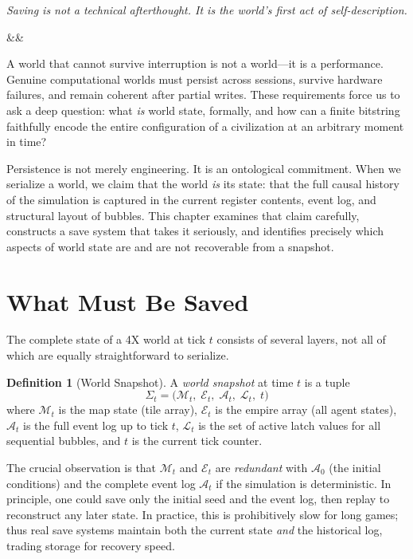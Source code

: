 \documentclass[11pt,a4paper,openany]{book}
\theoremstyle{plain}
\theoremstyle{definition}
\newtheorem{definition}[theorem]{Definition}
\theoremstyle{remark}
\newenvironment{background}{%
  \begin{mdframed}[
    linecolor=sphereblue!40, backgroundcolor=sphereblue!5,
    linewidth=1pt, innertopmargin=8pt, innerbottommargin=8pt,
    innerleftmargin=10pt, innerrightmargin=10pt,
    skipabove=10pt, skipbelow=6pt
  ]%
  \setlength{\parindent}{0pt}%
  \noindent{\textcolor{sphereblue}{\textbf{Background}}}\par\smallskip\ignorespaces
}{\end{mdframed}}
\newcommand{\chapterquote}[2]{%
  \par\vspace{0.8em}%
  \begin{flushright}%
    \begin{minipage}{0.65\textwidth}%
      {\itshape #1\par}%
      \ifx&#2&\else\vspace{0.3em}{\raggedleft\small--- #2\par}\fi%
    \end{minipage}%
  \end{flushright}%
  \vspace{0.8em}\par\noindent}
\begin{document}
\chapterquote{Saving is not a technical afterthought.
  It is the world's first act of self-description.
}{}

\begin{background}
  A world that cannot survive interruption is not a world---it is a
  performance. Genuine computational worlds must persist across sessions,
  survive hardware failures, and remain coherent after partial writes.
  These requirements force us to ask a deep question: what \emph{is}
  world state, formally, and how can a finite bitstring faithfully encode
  the entire configuration of a civilization at an arbitrary moment in time?

  Persistence is not merely engineering. It is an ontological commitment.
  When we serialize a world, we claim that the world \emph{is} its state:
  that the full causal history of the simulation is captured in the current
  register contents, event log, and structural layout of bubbles. This
  chapter examines that claim carefully, constructs a save system that
  takes it seriously, and identifies precisely which aspects of world state
  are and are not recoverable from a snapshot.
\end{background}

\section{What Must Be Saved}

The complete state of a 4X world at tick $t$ consists of several layers,
not all of which are equally straightforward to serialize.

\begin{definition}[World Snapshot]
  A \emph{world snapshot} at time $t$ is a tuple
  \[
    \Sigma_t = \bigl(\mathcal{M}_t,\; \mathcal{E}_t,\; \mathcal{A}_t,\;
    \mathcal{L}_t,\; t\bigr)
  \]
  where $\mathcal{M}_t$ is the map state (tile array), $\mathcal{E}_t$ is
  the empire array (all agent states), $\mathcal{A}_t$ is the full event
  log up to tick $t$, $\mathcal{L}_t$ is the set of active latch values
  for all sequential bubbles, and $t$ is the current tick counter.
\end{definition}

The crucial observation is that $\mathcal{M}_t$ and $\mathcal{E}_t$ are
\emph{redundant} with $\mathcal{A}_0$ (the initial conditions) and the
complete event log $\mathcal{A}_t$ if the simulation is deterministic.
In principle, one could save only the initial seed and the event log, then
replay to reconstruct any later state. In practice, this is prohibitively
slow for long games; thus real save systems maintain both the current
state \emph{and} the historical log, trading storage for recovery speed.
\end{document}
